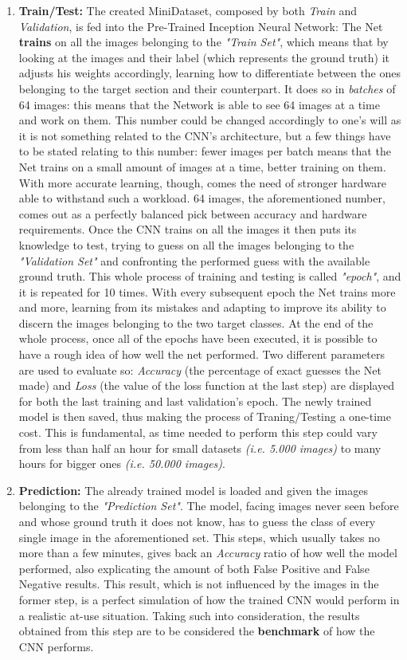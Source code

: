 \documentclass[../main.tex]{subfiles}
\begin{document}
\begin{enumerate}
	\item \textbf{Train/Test:} The created MiniDataset, composed by both \textit{Train} and \textit{Validation}, is fed into the Pre-Trained Inception Neural Network: The Net \textbf{trains} on all the images belonging to the \textit{"Train Set"}, which means that by looking at the images and their label (which represents the ground truth) it adjusts his weights accordingly, learning how to differentiate between the ones belonging to the target section and their counterpart. It does so in \textit{batches} of 64 images: this means that the Network is able to see 64 images at a time and work on them. This number could be changed accordingly to one's will as it is not something related to the CNN's architecture, but a few things have to be stated relating to this number: fewer images per batch means that the Net trains on a small amount of images at a time, better training on them. With more accurate learning, though, comes the need of stronger hardware able to withstand such a workload. 64 images, the aforementioned number, comes out as a perfectly balanced pick between accuracy and hardware requirements. Once the CNN trains on all the images it then puts its knowledge to test, trying to guess on all the images belonging to the \textit{"Validation Set"} and confronting the performed guess with the available ground truth. This whole process of training and testing is called \textit{"epoch"}, and it is repeated for 10 times. With every subsequent epoch the Net trains more and more, learning from its mistakes and adapting to improve its ability to discern the images belonging to the two target classes. At the end of the whole process, once all of the epochs have been executed, it is possible to have a rough idea of how well the net performed. Two different parameters are used to evaluate so: \textit{Accuracy} (the percentage of exact guesses the Net made) and \textit{Loss} (the value of the loss function at the last step) are displayed for both the last training and last validation's epoch. The newly trained model is then saved, thus making the process of Traning/Testing a one-time cost. This is fundamental, as time needed to perform this step could vary from less than half an hour for small datasets \textit{(i.e. 5.000 images)} to many hours for bigger ones \textit{(i.e. 50.000 images)}.

	\item \textbf{Prediction:} The already trained model is loaded and given the images belonging to the \textit{"Prediction Set"}. The model, facing images never seen before and whose ground truth it does not know, has to guess the class of every single image in the aforementioned set. This steps, which usually takes no more than a few minutes, gives back an \textit{Accuracy} ratio of how well the model performed, also explicating the amount of both False Positive and False Negative results. This result, which is not influenced by the images in the former step, is a perfect simulation of how the trained CNN would perform in a realistic at-use situation. Taking such into consideration, the results obtained from this step are to be considered the \textbf{benchmark} of how the CNN performs.
\end{enumerate}
\end{document}
